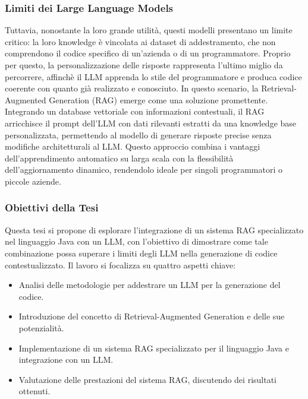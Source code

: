 \documentclass[12pt,a4paper,openright,twoside]{book}
\begin{document}
\subsubsection{Limiti dei Large Language Models}
Tuttavia, nonostante la loro grande utilità, questi modelli presentano un limite critico: la loro knowledge è vincolata ai dataset di addestramento, che non comprendono il codice specifico di un'azienda o di un programmatore.
Proprio per questo, la personalizzazione delle risposte rappresenta l'ultimo miglio da percorrere, affinchè il LLM apprenda lo stile del programmatore e produca codice coerente con quanto già realizzato e conosciuto.
In questo scenario, la Retrieval-Augmented Generation (RAG) emerge come una soluzione promettente.
Integrando un database vettoriale con informazioni contestuali, il RAG arricchisce il prompt dell’LLM con dati rilevanti estratti da una knowledge base personalizzata,
permettendo al modello di generare risposte precise senza modifiche architetturali al \ac{LLM}.
Questo approccio combina i vantaggi dell’apprendimento automatico su larga scala con la flessibilità dell’aggiornamento dinamico, rendendolo ideale per singoli programmatori o piccole aziende.

\subsubsection{Obiettivi della Tesi}
Questa tesi si propone di esplorare l’integrazione di un sistema RAG specializzato nel linguaggio Java con un LLM, con l’obiettivo di dimostrare come tale combinazione possa superare i limiti degli LLM nella generazione di codice contestualizzato.
Il lavoro si focalizza su quattro aspetti chiave:
\begin{itemize}
    \item Analisi delle metodologie per addestrare un LLM per la generazione del codice.
    \item Introduzione del concetto di Retrieval-Augmented Generation e delle sue potenzialità.
    \item Implementazione di un sistema RAG specializzato per il linguaggio Java e integrazione con un LLM.
    \item Valutazione delle prestazioni del sistema RAG, discutendo dei risultati ottenuti.
\end{itemize}
\end{document}
